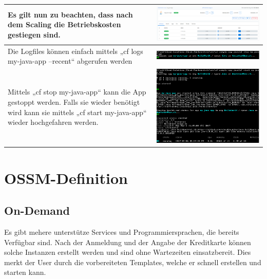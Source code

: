 \begin{longtable}{| p{5cm} | p{11cm} |}
Es gilt nun zu beachten, dass nach dem Scaling die Betriebskosten gestiegen sind. &\includegraphics[width=0.65\columnwidth, valign=T]{images/image18.png} \\ \hline
Die Logfiles können einfach mittels „cf logs my-java-app --recent“ abgerufen werden &\includegraphics[width=0.65\columnwidth, valign=T]{images/image19.png} \\ \hline
Mittels „cf stop my-java-app“ kann die App gestoppt werden. Falls sie wieder benötigt wird kann sie mittels „cf start my-java-app“ wieder hochgefahren werden. 
&\includegraphics[width=0.65\columnwidth, valign=T]{images/image20.png} \\ \hline
\end{longtable}

\chapter{OSSM-Definition}
\section{On-Demand}
Es gibt mehere unterstütze Services und Programmiersprachen, die bereits Verfügbar sind. Nach der Anmeldung und der Angabe der Kreditkarte können solche Instanzen erstellt werden und sind ohne Wartezeiten einsatzbereit. Dies merkt der User durch die vorbereiteten Templates, welche er schnell erstellen und starten kann.
